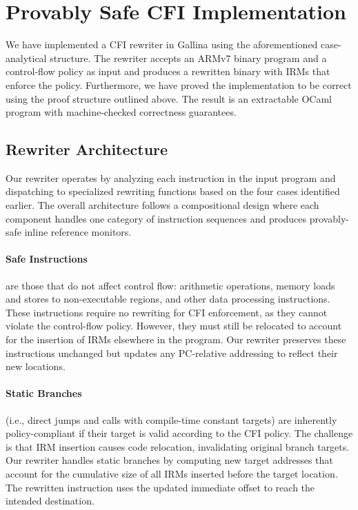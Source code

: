 \section{Provably Safe CFI Implementation}

We have implemented a CFI rewriter in Gallina using the aforementioned case-analytical structure.
The rewriter accepts an ARMv7 binary program and a control-flow policy as input and produces a rewritten binary with IRMs that enforce the policy.
Furthermore, we have proved the implementation to be correct using the proof structure outlined above.
The result is an extractable OCaml program with machine-checked correctness guarantees.

\subsection{Rewriter Architecture}

Our rewriter operates by analyzing each instruction in the input program and dispatching to specialized rewriting functions based on the four cases identified earlier.
The overall architecture follows a compositional design where each component handles one category of instruction sequences and produces provably-safe inline reference monitors.

\paragraph{Safe Instructions} are those that do not affect control flow: arithmetic operations, memory loads and stores to non-executable regions, and other data processing instructions.
These instructions require no rewriting for CFI enforcement, as they cannot violate the control-flow policy.
However, they must still be relocated to account for the insertion of IRMs elsewhere in the program.
Our rewriter preserves these instructions unchanged but updates any PC-relative addressing to reflect their new locations.

\paragraph{Static Branches} (i.e., direct jumps and calls with compile-time constant targets) are inherently policy-compliant if their target is valid according to the CFI policy.
The challenge is that IRM insertion causes code relocation, invalidating original branch targets.
Our rewriter handles static branches by computing new target addresses that account for the cumulative size of all IRMs inserted before the target location.
The rewritten instruction uses the updated immediate offset to reach the intended destination.

